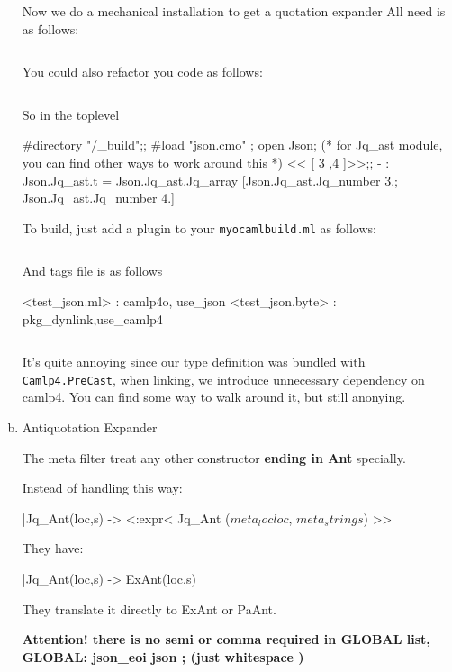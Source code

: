 \begin{enumerate}[(a)]
Now we do a mechanical installation to get a quotation expander 
All need is as follows:
\inputminted[fontsize=\scriptsize, firstline=63,lastline=83]{ocaml}{camlp4/code/jake/json.ml}

You could also refactor you code as follows:

\inputminted[fontsize=\scriptsize, firstline=84,lastline=96]{ocaml}{camlp4/code/jake/json.ml}

So in the toplevel
\begin{ocamlcode}
#directory "/_build";;
#load "json.cmo" ;
open Json;  
(* for Jq_ast module, you can find other ways to work
around this *)
 << [ 3 ,4 ]>>;;
- : Json.Jq_ast.t = Json.Jq_ast.Jq_array [Json.Jq_ast.Jq_number 3.; Json.Jq_ast.Jq_number
4.]
\end{ocamlcode}


To build, just add a plugin to your \verb|myocamlbuild.ml| as follows:

\inputminted[fontsize=\scriptsize, firstline=117,lastline=133]{ocaml}{camlp4/code/jake/myocamlbuild.ml}


And tags file is as follows
\begin{bluetext}
<test_json.ml> : camlp4o, use_json
<test_json.byte> : pkg_dynlink,use_camlp4
\end{bluetext}


\inputminted[fontsize=\scriptsize, ]{ocaml}{camlp4/code/jake/test_json.ml}
It's quite annoying since our type definition was bundled with
\verb|Camlp4.PreCast|, when linking, we introduce unnecessary
dependency on camlp4. You can find some way to walk around it, but
still anonying.


\item Antiquotation Expander


  The meta filter treat any other constructor \textbf{ending in Ant}
specially.


Instead of handling this way:
\begin{ocamlcode}
  |Jq_Ant(loc,s) -> <:expr< Jq_Ant ($meta_loc loc$, $meta_string s$) >>
\end{ocamlcode}


They have:
\begin{ocamlcode}
  |Jq_Ant(loc,s) -> ExAnt(loc,s) 
\end{ocamlcode}
They translate it directly to ExAnt or PaAnt.

\textbf{Attention! there is no semi or comma required in GLOBAL list,
  GLOBAL: json\_eoi  json ; (just whitespace ) }






\end{enumerate}
